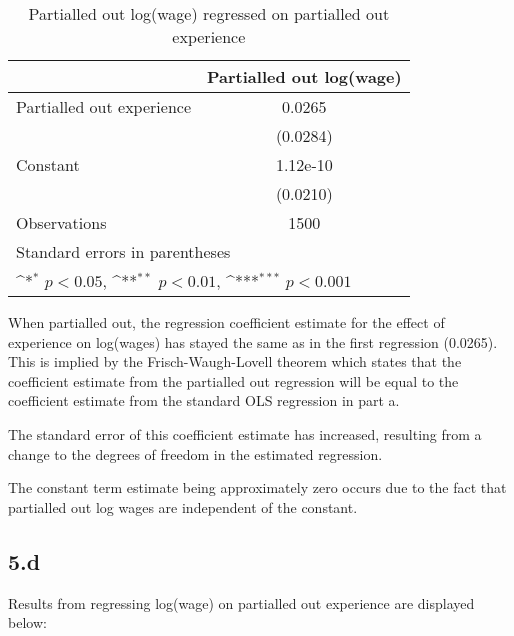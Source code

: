 \documentclass{article}
\begin{document}
\begin{table}[htbp]\centering
\def\sym#1{\ifmmode^{#1}\else\(^{#1}\)\fi}
\caption{Partialled out log(wage) regressed on partialled out experience}
\begin{tabular}{l*{1}{c}}
\hline\hline
                    &\multicolumn{1}{c}{Partialled out log(wage)}\\
\hline
Partialled out experience&      0.0265         \\
                    &    (0.0284)         \\
[1em]
Constant            &    1.12e-10         \\
                    &    (0.0210)         \\
\hline
Observations        &        1500         \\
\hline\hline
\multicolumn{2}{l}{\footnotesize Standard errors in parentheses}\\
\multicolumn{2}{l}{\footnotesize \sym{*} \(p<0.05\), \sym{**} \(p<0.01\), \sym{***} \(p<0.001\)}\\
\end{tabular}
\end{table}

When partialled out, the regression coefficient estimate for the effect of experience on log(wages) has stayed the same as in the first regression (0.0265). This is implied by the Frisch-Waugh-Lovell theorem which states that the coefficient estimate from the partialled out regression will be equal to the coefficient estimate from the standard OLS regression in part a.

The standard error of this coefficient estimate has increased, resulting from a change to the degrees of freedom in the estimated regression.

The constant term estimate being approximately zero occurs due to the fact that partialled out log wages are independent of the constant. 

\clearpage
\subsection*{5.d}

Results from regressing log(wage) on partialled out experience are displayed below:
\end{document}
